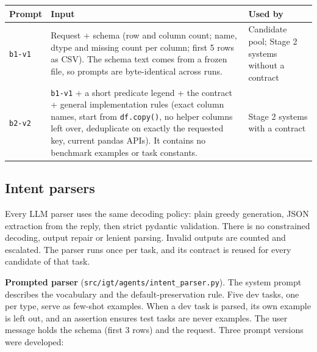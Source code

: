 \documentclass[11pt]{article}
\begin{document}
\begin{table}[!tp]
\centering\footnotesize\setlength{\tabcolsep}{3pt}\renewcommand{\arraystretch}{1.1}
\begin{tabularx}{\textwidth}{l>{\raggedright\arraybackslash}X>{\raggedright\arraybackslash}X}
\toprule
\textbf{Prompt} & \textbf{Input} & \textbf{Used by} \\
\midrule
\texttt{b1-v1} & Request + schema (row and column count; name, dtype and missing count per column; first 5 rows as CSV). The schema text comes from a frozen file, so prompts are byte-identical across runs. & Candidate pool; Stage 2 systems without a contract \\
\texttt{b2-v2} & \texttt{b1-v1} + a short predicate legend + the contract + general implementation rules (exact column names, start from \texttt{df.\allowbreak{}copy()}, no helper columns left over, deduplicate on exactly the requested key, current pandas APIs). It contains no benchmark examples or task constants. & Stage 2 systems with a contract \\
\bottomrule
\end{tabularx}
\end{table}

\subsection{Intent parsers}

Every LLM parser uses the same decoding policy: plain greedy generation,
JSON extraction from the reply, then strict pydantic validation. There
is no constrained decoding, output repair or lenient parsing. Invalid
outputs are counted and escalated. The parser runs once per task, and
its contract is reused for every candidate of that task.

\textbf{Prompted parser}
(\texttt{src/\allowbreak{}igt/\allowbreak{}agents/\allowbreak{}intent\_\allowbreak{}parser.\allowbreak{}py}).
The system prompt describes the vocabulary and the default-preservation
rule. Five dev tasks, one per type, serve as few-shot examples. When a
dev task is parsed, its own example is left out, and an assertion
ensures test tasks are never examples. The user message holds the schema
(first 3 rows) and the request. Three prompt versions were developed:
\end{document}
